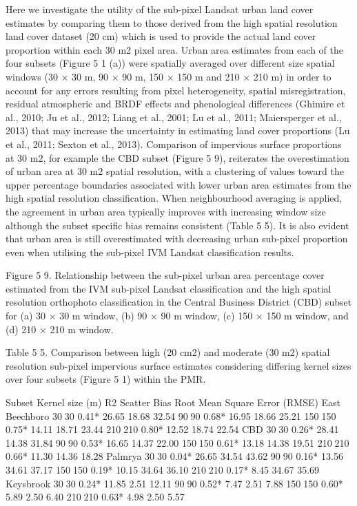 \documentclass[]{book}
\begin{document}
Here we investigate the utility of the sub-pixel Landsat urban land
cover estimates by comparing them to those derived from the high spatial
resolution land cover dataset (20 cm) which is used to provide the
actual land cover proportion within each 30 m2 pixel area. Urban area
estimates from each of the four subsets (Figure 5 1 (a)) were spatially
averaged over different size spatial windows (30 × 30 m, 90 × 90 m, 150
× 150 m and 210 × 210 m) in order to account for any errors resulting
from pixel heterogeneity, spatial misregistration, residual atmospheric
and BRDF effects and phenological differences (Ghimire et al., 2010; Ju
et al., 2012; Liang et al., 2001; Lu et al., 2011; Maiersperger et al.,
2013) that may increase the uncertainty in estimating land cover
proportions (Lu et al., 2011; Sexton et al., 2013). Comparison of
impervious surface proportions at 30 m2, for example the CBD subset
(Figure 5 9), reiterates the overestimation of urban area at 30 m2
spatial resolution, with a clustering of values toward the upper
percentage boundaries associated with lower urban area estimates from
the high spatial resolution classification. When neighbourhood averaging
is applied, the agreement in urban area typically improves with
increasing window size although the subset specific bias remains
consistent (Table 5 5). It is also evident that urban area is still
overestimated with decreasing urban sub-pixel proportion even when
utilising the sub-pixel IVM Landsat classification results.

Figure 5 9. Relationship between the sub-pixel urban area percentage
cover estimated from the IVM sub-pixel Landsat classification and the
high spatial resolution orthophoto classification in the Central
Business District (CBD) subset for (a) 30 × 30 m window, (b) 90 × 90 m
window, (c) 150 × 150 m window, and (d) 210 × 210 m window.

Table 5 5. Comparison between high (20 cm2) and moderate (30 m2) spatial
resolution sub-pixel impervious surface estimates considering differing
kernel sizes over four subsets (Figure 5 1) within the PMR.

Subset Kernel size (m) R2 Scatter Bias Root Mean Square Error (RMSE)
East Beechboro 3030 0.41* 26.65 18.68 32.54 9090 0.68* 16.95 18.66
25.21 150150 0.75* 14.11 18.71 23.44 210210 0.80* 12.52 18.74 22.54
CBD 3030 0.26* 28.41 14.38 31.84 9090 0.53* 16.65 14.37 22.00 150150
0.61* 13.18 14.38 19.51 210210 0.66* 11.30 14.36 18.28 Palmrya 3030
0.04* 26.65 34.54 43.62 9090 0.16* 13.56 34.61 37.17 150150 0.19*
10.15 34.64 36.10 210210 0.17* 8.45 34.67 35.69 Keysbrook 3030 0.24*
11.85 2.51 12.11 9090 0.52* 7.47 2.51 7.88 150150 0.60* 5.89 2.50 6.40
210210 0.63* 4.98 2.50 5.57
\end{document}
